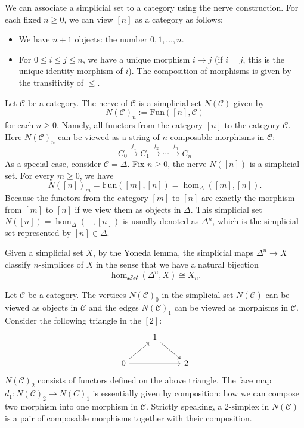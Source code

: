 We can associate a simplicial set to a category using the nerve construction. For each fixed \(n\geq 0\), we can view \([n]\) as a category as follows:
\begin{itemize}
    \item We have \(n+1\) objects: the number \(0,1,\ldots,n\).
    \item For \(0\leq i\leq j\leq n\), we have a unique morphism \(i\rightarrow j\) (if \(i=j\), this is the unique identity morphism of \(i\)). The composition of morphisms is given by the transitivity of \(\leq\).
\end{itemize}

\begin{example}
    Let \(\mathcal{C}\) be a category. The nerve of \(\mathcal{C}\) is a simplicial set \(N(\mathcal{C})\) given by
    \[N(\mathcal{C})_n:=\text{Fun}([n],\mathcal{C})\]
    for each \(n\geq 0\). Namely, all functors from the category \([n]\) to the category \(\mathcal{C}\). Here \(N(\mathcal{C})_n\) can be viewed as a string of \(n\) composable morphisms in \(\mathcal{C}\):
    \[C_0\xrightarrow{f_1}C_1\xrightarrow{f_2}\cdots\xrightarrow{f_{n}}C_n\]
    As a special case, consider \(\mathcal{C}=\Delta\). Fix \(n\geq 0\), the nerve \(N([n])\) is a simplicial set. For every \(m\geq 0\), we have
    \[N([n])_m=\text{Fun}([m],[n])=\hom_\Delta([m],[n]).\]
    Because the functors from the category \([m]\) to \([n]\) are exactly the morphism from \([m]\) to \([n]\) if we view them as objects in \(\Delta\). This simplicial set \(N([n])=\hom_\Delta(-,[n])\) is usually denoted as \(\Delta^n\), which is the simplicial set represented by \([n]\in \Delta\).

    Given a simplicial set \(X\), by the Yoneda lemma, the simplicial maps \(\Delta^n\rightarrow X\) classify \(n\)-simplices of \(X\) in the sense that we have a natural bijection
    \[\hom_{\mathcal{sSet}}(\Delta^n,X)\cong X_n.\]
\end{example}

Let \(\mathcal{C}\) be a category. The vertices \(N(\mathcal{C})_0\) in the simplicial set \(N(\mathcal{C})\) can be viewed as objects in \(\mathcal{C}\) and the edges \(N(\mathcal{C})_1\) can be viewed as morphisms in \(\mathcal{C}\). Consider the following triangle in the \([2]\):
\[\begin{tikzcd}
        & 1 \\
        0 && 2
        \arrow[from=1-2, to=2-3]
        \arrow[from=2-1, to=1-2]
        \arrow[from=2-1, to=2-3]
    \end{tikzcd}\]
\(N(\mathcal{C})_2\) consists of functors defined on the above triangle. The face map \(d_1:N(\mathcal{C})_2\rightarrow N(C)_1\) is essentially given by composition: how we can compose two morphism into one morphism in \(\mathcal{C}\). Strictly speaking, a 2-simplex in \(N(\mathcal{C})\) is a pair of composable morphisms together with their composition.

